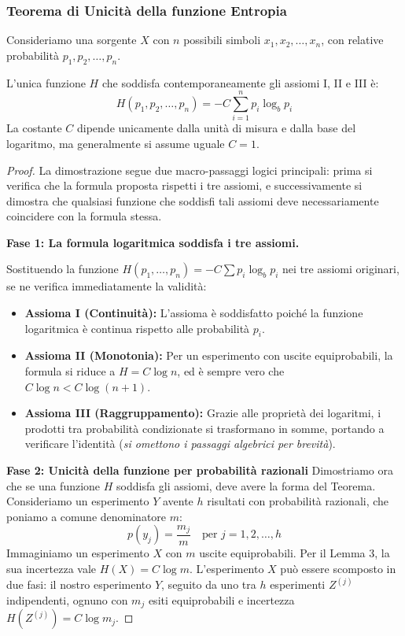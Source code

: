 \subsubsection*{Teorema di Unicità della funzione Entropia} 
Consideriamo una sorgente $X$ con $n$ possibili simboli ${x_1,x_2,\dots,x_n}$, con relative probabilità ${p_1,p_2,\dots,p_n}$.
\begin{theorem}
L'unica funzione $H$ che soddisfa contemporaneamente gli assiomi I, II e III è:
$$H(p_1, p_2, \dots, p_n) = -C \sum_{i=1}^{n} p_i \log_b p_i$$ 
La costante $C$ dipende unicamente dalla unità di misura e dalla base del logaritmo, ma generalmente si assume uguale $C=1$.
\end{theorem}

\begin{proof}
La dimostrazione segue due macro-passaggi logici principali: prima si verifica che la formula proposta rispetti i tre assiomi, e successivamente si dimostra che qualsiasi funzione che soddisfi tali assiomi deve necessariamente coincidere con la formula stessa.

\medskip
\textbf{Fase 1: La formula logaritmica soddisfa i tre assiomi.} 

Sostituendo la funzione $H(p_1, \dots, p_n) = -C \sum p_i \log_b p_i$ nei tre assiomi originari, se ne verifica immediatamente la validità:
\begin{itemize}
    \item \textbf{Assioma I (Continuità):} L'assioma è soddisfatto poiché la funzione logaritmica è continua rispetto alle probabilità $p_i$. 
    \item \textbf{Assioma II (Monotonia):} Per un esperimento con uscite equiprobabili, la formula si riduce a $H = C \log n$, ed è sempre vero che $C \log n < C \log(n+1)$.
    \item \textbf{Assioma III (Raggruppamento):} Grazie alle proprietà dei logaritmi, i prodotti tra probabilità condizionate si trasformano in somme, portando a verificare l'identità (\textit{si omettono i passaggi algebrici per brevità}).
\end{itemize}

\medskip
\noindent\textbf{Fase 2: Unicità della funzione per probabilità razionali} 
Dimostriamo ora che se una funzione $H$ soddisfa gli assiomi, deve avere la forma del Teorema. Consideriamo un esperimento $Y$ avente $h$ risultati con probabilità razionali, che poniamo a comune denominatore $m$: 
\[ p(y_j) = \frac{m_j}{m} \quad \text{per } j = 1, 2, \dots, h \]
Immaginiamo un esperimento $X$ con $m$ uscite equiprobabili. Per il Lemma 3, la sua incertezza vale $H(X) = C \log m$. 
L'esperimento $X$ può essere scomposto in due fasi: il nostro esperimento $Y$, seguito da uno tra $h$ esperimenti $Z^{(j)}$ indipendenti, ognuno con $m_j$ esiti equiprobabili e incertezza $H(Z^{(j)}) = C \log m_j$. 


\end{proof}
